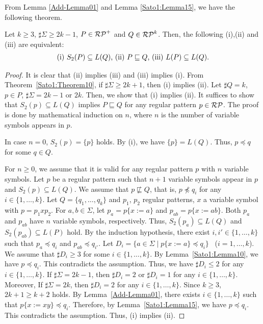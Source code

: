 From Lemma \ref{Add-Lemma01} 
and Lemma \ref{Sato1:Lemma15}, 
we have the following theorem.


\begin{thm}\label{Theorem17}
    Let $k \geq 3$, $\sharp\Sigma \geq 2k-1$, $P \in \mathcal{RP}^{+}$ and
    $Q \in \mathcal{RP}^{k}$.
    Then, the following (i),(ii) and (iii) are equivalent:
    \[
        \begin{tabular}{ll}
            $(\mathrm{i})$ $S_{2}(P) \subseteq L(Q)$,
            $(\mathrm{ii})$ $P \sqsubseteq Q$,
            $(\mathrm{iii})$ $L(P) \subseteq L(Q)$.
        \end{tabular}
    \]
\end{thm}


\begin{proof}
    It is clear that (ii) implies (iii) and (iii) implies (i).
    From Theorem~\ref{Sato1:Theorem10}, 
    if $\sharp\Sigma \geq 2k+1$, then
    (i) implies (ii).
    Let $\sharp Q = k$, $p \in P$, $\sharp\Sigma = 2k-1$ or $2k$.
    Then, we show that (i) implies (ii).
    It suffices to show that $S_{2}(p) \subseteq L(Q)$ implies $P \sqsubseteq Q$
    for any regular pattern $p \in \mathcal{RP}$.
    The proof is done by mathematical induction on $n$, where $n$ is the number of variable symbols appears in $p$.

    In case $n=0$, $S_{2}(p) = \{p\}$ holds.
    By (i), we have $\{p\} = L(Q)$. Thus, $p \preceq q$ for some $q \in Q$.

    For $n \geq 0$,
    we assume that it is valid for any regular pattern $p$
    with $n$ variable symbols.
    Let $p$ be a regular pattern such that $n+1$ variable symbols appear in $p$
    and $S_{2}(p) \subseteq L(Q)$.
    We assume that $p \not\sqsubseteq Q$, that is, $p \not\preceq q_{i}$
    for any $i \in \{1,\ldots,k\}$.
    Let $Q = \{q_{1},\ldots,q_{k}\}$ and
    $p_{1}$, $p_{2}$ regular patterns, $x$ a variable symbol with
    $p = p_{1}xp_{2}$.
    For $a, b \in \Sigma$,
    let $p_{a}=p\{x:=a\}$ and $p_{ab}=p\{x:=ab\}$.
    Both $p_{a}$ and $p_{ab}$ have $n$ variable symbols, respectively.
    Thus, $S_{2}(p_{a}) \subseteq L(Q)$ and $S_{2}(p_{ab}) \subseteq L(P)$ hold.
    By the induction hypothesis,
    there exist $i, i' \in \{1,\ldots,k\}$ such that
    $p_{a} \preceq q_{i}$ and $p_{ab} \preceq q_{i'}$.
    Let $D_{i} = \{a \in \Sigma \mid p\{x:=a\} \preceq q_{i}\}$ \ ($i=1,\ldots,k$).
    We assume that $\sharp D_{i} \geq 3$ for some $i \in \{1,\ldots, k\}$.
    By Lemma~\ref{Sato1:Lemma10}, 
    we have $p \preceq q_{i}$.
    This contradicts the assumption.
    Thus, we have $\sharp D_{i} \leq 2$ for any $i \in \{1,\ldots,k\}$.
    If $\sharp\Sigma = 2k-1$, then
    $\sharp D_{i}=2$ or $\sharp D_{i}=1$ for any $i \in \{1,\ldots,k\}$.
    Moreover,
    If $\sharp\Sigma = 2k$, then
    $\sharp D_{i}=2$ for any $i \in \{1,\ldots,k\}$.
    Since $k \geq 3$, $2k+1 \geq k+2$ holds.
    By Lemma~\ref{Add-Lemma01},
    there exists $i \in \{1,\ldots,k\}$ such that $p\{x:=xy\} \preceq q_{i}$.
    Therefore, by Lemma~\ref{Sato1:Lemma15}, 
    we have $p \preceq q_{i}$.
    This contradicts the assumption.
    Thus, (i) implies (ii).
\end{proof}

